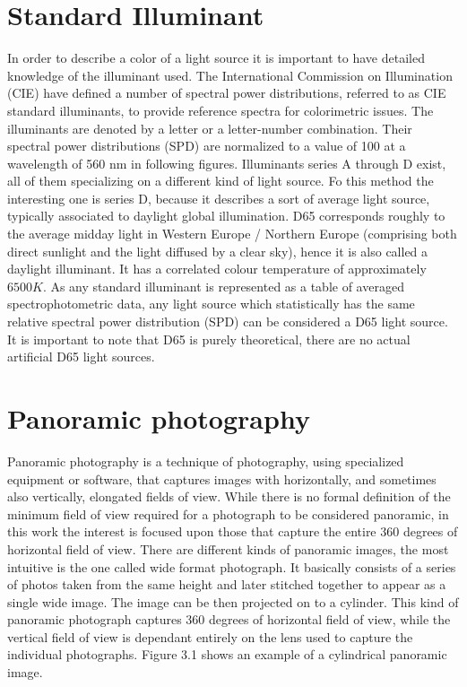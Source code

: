 \section{Standard Illuminant}
In order to describe a color of a light source it is important to have detailed knowledge of the illuminant used. The International Commission on Illumination (CIE)  have defined a number of spectral power distributions, referred to as CIE standard illuminants, to provide reference spectra for colorimetric issues. The illuminants are denoted by a letter or a letter-number combination. Their spectral power distributions (SPD) are normalized to a value of 100 at a wavelength of 560 nm in following figures. Illuminants series A through D exist, all of them specializing on a different kind of light source. Fo this method the interesting one is series D, because it describes a sort of average light source, typically associated to daylight global illumination.\newline
D65 corresponds roughly to the average midday light in Western Europe / Northern Europe (comprising both direct sunlight and the light diffused by a clear sky), hence it is also called a daylight illuminant. It has a correlated colour temperature of approximately $6500 K$. As any standard illuminant is represented as a table of averaged spectrophotometric data, any light source which statistically has the same relative spectral power distribution (SPD) can be considered a D65 light source. It is important to note that D65 is purely theoretical, there are no actual artificial D65 light sources.\cite{DeeSixFive}

\section{Panoramic photography}
Panoramic photography is a technique of photography, using specialized equipment or software, that captures images with horizontally, and sometimes also vertically, elongated fields of view. While there is no formal definition of the minimum field of view required for a photograph to be considered panoramic, in this work the interest is focused upon those that capture the entire 360 degrees of horizontal field of view. \newline
There are different kinds of panoramic images, the most intuitive is the one called wide format photograph. It basically consists of a series of photos taken from the same height and later stitched together to appear as a single wide image. The image can be then projected on to a cylinder. This kind of panoramic photograph captures 360 degrees of horizontal field of view, while the vertical field of view is dependant entirely on the lens used to capture the individual photographs. Figure 3.1 shows an example of a cylindrical panoramic image. 

